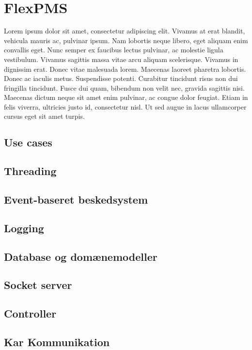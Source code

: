 \section{FlexPMS}
Lorem ipsum dolor sit amet, consectetur adipiscing elit. Vivamus at erat blandit, vehicula mauris ac, pulvinar ipsum. Nam lobortis neque libero, eget aliquam enim convallis eget. Nunc semper ex faucibus lectus pulvinar, ac molestie ligula vestibulum. Vivamus sagittis massa vitae arcu aliquam scelerisque. Vivamus in dignissim erat. Donec vitae malesuada lorem. Maecenas laoreet pharetra lobortis. Donec ac iaculis metus. Suspendisse potenti. Curabitur tincidunt risus non dui fringilla tincidunt. Fusce dui quam, bibendum non velit nec, gravida sagittis nisi. Maecenas dictum neque sit amet enim pulvinar, ac congue dolor feugiat. Etiam in felis viverra, ultricies justo id, consectetur nisl. Ut sed augue in lacus ullamcorper cursus eget sit amet turpis.\\


\subsection{Use cases}


\subsection{Threading}


\subsection{Event-baseret beskedsystem}


\subsection{Logging}


\subsection{Database og domænemodeller}


\subsection{Socket server}


\subsection{Controller}


\subsection{Kar Kommunikation}

